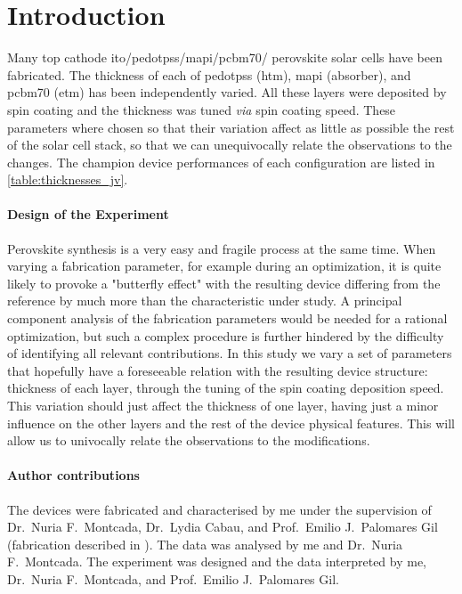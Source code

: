 
\section{Introduction}

	Many top cathode \gls{ito}\-/\gls{pedotpss}\-/\gls{mapi}\-/\gls{pcbm70}\-/ perovskite solar cells have been fabricated.
	The thickness of each of \gls{pedotpss} (\gls{htm}), \gls{mapi} (absorber), and \gls{pcbm70} (\gls{etm}) has been independently varied.
	All these layers were deposited by spin coating and the thickness was tuned \textsl{via} spin coating speed.
	These parameters where chosen so that their variation affect as little as possible the rest of the solar cell stack, so that we can unequivocally relate the observations to the changes.
	The champion device performances of each configuration are listed in \cref{table:thicknesses_jv}.


	\paragraph{Design of the Experiment}
	Perovskite synthesis is a very easy and fragile process at the same time.
	When varying a fabrication parameter, for example during an optimization, it is quite likely to provoke a "butterfly effect" with the resulting device differing from the reference by much more than the characteristic under study.
	A principal component analysis of the fabrication parameters would be needed for a rational optimization, but such a complex procedure is further hindered by the difficulty of identifying all relevant contributions.
	In this study we vary a set of parameters that hopefully have a foreseeable relation with the resulting device structure: thickness of each layer, through the tuning of the spin coating deposition speed.
	This variation should just affect the thickness of one layer, having just a minor influence on the other layers and the rest of the device physical features.
	This will allow us to univocally relate the observations to the modifications.

	\paragraph{Author contributions}
	The devices were fabricated and characterised by me under the supervision of Dr.\ Nuria F.\ Montcada, Dr.\ Lydia Cabau, and Prof.\ Emilio J.\ Palomares Gil (fabrication described in ).
	The data was analysed by me and Dr.\ Nuria F.\ Montcada.
	The experiment was designed and the data interpreted by me, Dr.\ Nuria F.\ Montcada, and Prof.\ Emilio J.\ Palomares Gil.



